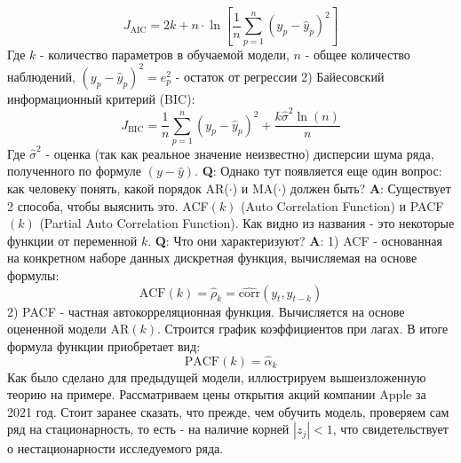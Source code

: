 	\begin{equation}
		J_{\text{AIC}} = 2k + n \cdot \ln\left[\frac{1}{n} \sum_{p = 1}^n \left(y_p- \hat{y}_p \right)^2\right]
	\end{equation}
	Где $k$ - количество параметров в обучаемой модели, $n$ - общее количество наблюдений, $(y_p - \hat{y}_p)^2 = e_p^2$ - остаток от регрессии 2) Байесовский информационный критерий (BIC):
	\begin{equation}
	 J_{\text{BIC}} = \frac{1}{n} \sum_{p = 1}^n \left(y_p - \hat{y}_p \right)^2 + \frac{k \hat{\sigma}^2 \ln(n)}{n}
	\end{equation} 
	Где $\hat{\sigma}^2$ - оценка (так как реальное значение неизвестно) дисперсии шума ряда, полученного по формуле $(y - \hat{y})$. \cite{alexandridis2014wavelet} \textbf{Q}: Однако тут появляется еще один вопрос: как человеку понять, какой порядок AR($\cdot$) и MA($\cdot$) должен быть? \textbf{A}: Существует 2 способа, чтобы выяснить это. ACF$(k)$ (Auto Correlation Function) и PACF$(k)$ (Partial Auto Correlation Function). Как видно из названия - это некоторые функции от переменной $k$. \textbf{Q}: Что они характеризуют? \textbf{A}: 1) ACF - основанная на конкретном наборе данных дискретная функция, вычисляемая на основе формулы: 
	\begin{equation}
		\text{ACF}(k) = \hat{\rho}_k = \hat{\text{corr}}(y_t, y_{t - k})
	\end{equation}
	2) PACF - частная автокорреляционная функция. Вычисляется на основе оцененной модели AR$(k)$. Строится график коэффициентов при лагах. В итоге формула функции приобретает вид:
	\begin{equation}
		\text{PACF}(k) = \hat{\alpha}_k
	\end{equation}
	Как было сделано для предыдущей модели, иллюстрируем вышеизложенную теорию на примере. Рассматриваем цены открытия акций компании Apple за 2021 год. Стоит заранее сказать, что прежде, чем обучить модель, проверяем сам ряд на стационарность, то есть - на наличие корней $|z_j| < 1$, что свидетельствует о нестационарности исследуемого ряда.
